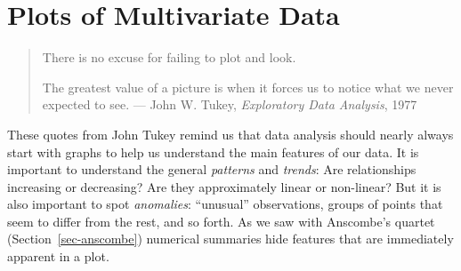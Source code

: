 \documentclass[
  letterpaper,
  10pt,
  krantz2]{krantz}
\begin{document}

\chapter{Plots of Multivariate Data}\label{sec-multivariate_plots}

\renewcommand*{\vec}[1]{\mathbf{#1}}
\newcommand{\trans}{^\mathsf{T}}
\newcommand*{\mat}[1]{\mathbf{#1}}
\newcommand*{\diag}[1]{\mathrm{diag}\, #1}

\renewcommand*{\det}[1]{\mathrm{det}(#1)}
\newcommand*{\rank}[1]{\mathrm{rank} (\mathbf{#1})}
\newcommand*{\trace}[1]{\mathrm{tr} (\mathbf{#1})}
\newcommand*{\dev}[1]{(#1 - \bar{#1})}
\newcommand*{\inv}[1]{\mat{#1}^{-1}}
\newcommand*{\half}[1]{\mat{#1}^{1/2}}
\newcommand*{\invhalf}[1]{\mat{#1}^{-1/2}}
\newcommand*{\nvec}[2]{{#1}_{1}, {#1}_{2},\ldots,{#1}_{#2}}
\newcommand*{\Beta}{\boldsymbol{B}}
\newcommand*{\Epsilon}{\boldsymbol{\Large\varepsilon}}
\newcommand*{\period}{\:\: .}
\newcommand*{\comma}{\:\: ,}
\newcommand*{\given}{\, | \,}
\newcommand*{\Real}[1]{\mathbb{R}^{#1}}
\newcommand*{\degree}[1]{{#1}^{\circ}}

\newcommand{\sizedmat}[2]{\mathord{\mathop{\mat{#1}}\limits_{#2}}}

\renewcommand*{\H}{\mathbf{H}}               
\newcommand*{\E}{\mathbf{E}}
\newcommand*{\widebar}[1]{\overline{#1}}

\newcommand{\Var}{\mathsf{Var}}
\newcommand{\Cov}{\mathsf{Cov}}
\newcommand{\HO}{\mathcal{H}_0}

\newcommand*{\V}{\mathcal{V}}

\newcommand{\pkg}[1]{\textsf{#1}}
\newcommand{\Rpackage}[1]{\pkg{#1} package}

\begin{quote}
There is no excuse for failing to plot and look.

The greatest value of a picture is when it forces us to notice what we
never expected to see. --- John W. Tukey, \emph{Exploratory Data
Analysis}, 1977
\end{quote}

These quotes from John Tukey remind us that data analysis should nearly
always start with graphs to help us understand the main features of our
data. It is important to understand the general \emph{patterns} and
\emph{trends}: Are relationships increasing or decreasing? Are they
approximately linear or non-linear? But it is also important to spot
\emph{anomalies}: ``unusual'' observations, groups of points that seem
to differ from the rest, and so forth. As we saw with Anscombe's quartet
(Section~\ref{sec-anscombe}) numerical summaries hide features that are
immediately apparent in a plot.
\end{document}

